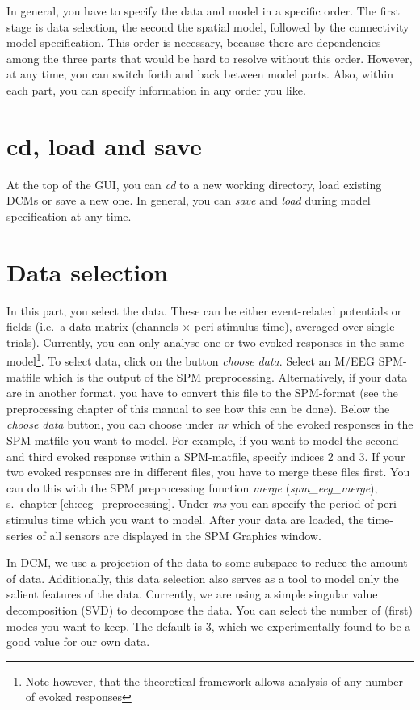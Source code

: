 In general, you have to specify the data and model in a specific
order. The first stage is data selection, the second the spatial model,
followed by the connectivity model specification. This order is
necessary, because there are dependencies among the three parts that
would be hard to resolve without this order. However, at any time, you
can switch forth and back between model parts. Also, within each part,
you can specify information in any order you like.

\section{cd, load and save}
At the top of the GUI, you can \textit{cd} to a new working directory,
load existing DCMs or save a new one. In general, you can
\textit{save} and \textit{load} during model
specification at any time.

\section{Data selection}
In this part, you select the data. These can be either event-related
potentials or fields (i.e.~a data matrix (channels $\times$
peri-stimulus time), averaged over single trials). Currently, you can
only analyse one or two evoked responses in the same
model\footnote{Note however, that the theoretical framework allows
  analysis of any number of evoked responses}. To select
data, click on the button \textit{choose data}. Select an M/EEG
SPM-matfile which is the output of the SPM preprocessing. Alternatively, if your
data are in another format, you have to convert this file to the
SPM-format (see the preprocessing chapter of this manual to see how
this can be done). Below the \textit{choose data} button, you can
choose under \textit{nr} which of the evoked responses in the
SPM-matfile you want to model. For example, if you want to model the
second and third evoked response within a SPM-matfile, specify
indices 2 and 3. If your two evoked responses are in different files,
you have to merge these files first. You can do this with the SPM
preprocessing function \textit{merge} (\textit{spm\_eeg\_merge}),
s.~chapter \ref{ch:eeg_preprocessing}.
Under \textit{ms} you can specify the period of peri-stimulus time
which you want to model. After your data are loaded, the time-series of
all sensors are displayed in the SPM Graphics window. 

In DCM, we use a projection of the data to some subspace to reduce the
amount of data. Additionally, this data selection also serves as a
tool to model only the salient features of the
data. Currently, we are using a simple singular value decomposition
(SVD) to decompose the data. You can select the number of (first)
modes you want to keep. The default is 3, which we experimentally
found to be a good value for our own data.


